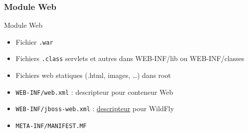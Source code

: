 \documentclass[english, french]{beamer}
\begin{document}
\begin{frame}
	\frametitle{Module Web}
	\begin{block}{Module Web}
		\begin{itemize}
			\item Fichier \texttt{.war}
			\item Fichiers \texttt{.class} servlets et autres dans WEB-INF/lib ou WEB-INF/classes
			\item Fichiers web statiques (.html, images, …) dans root
			\item \texttt{WEB-INF/web.xml} : descripteur pour conteneur Web
			\item \texttt{WEB-INF/jboss-web.xml} : \href{http://docs.wildfly.org/14/Developer_Guide.html\#Deployment_Descriptors_used_In_WildFly}{descripteur} pour WildFly
			\item \texttt{META-INF/MANIFEST.MF}
		\end{itemize}
	\end{block}
\end{frame}
\end{document}
